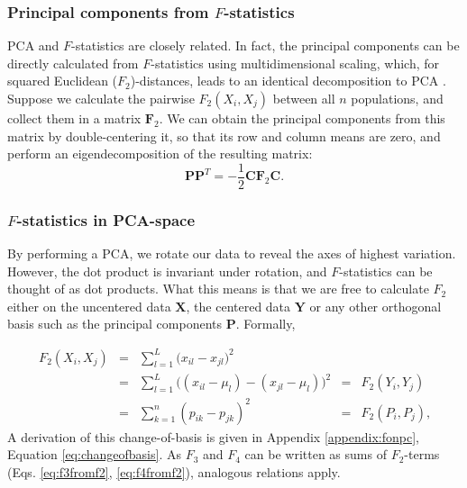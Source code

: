 \documentclass[12pt,fullpage, a4paper]{article}
\newcommand{\MX}{\mathbf{X}} %
\newcommand{\MC}{\mathbf{C}} %
\newcommand{\MY}{\mathbf{Y}} %
\newcommand{\MF}{\mathbf{F}_2} %
\newcommand{\MP}{\mathbf{P}} %
\begin{document}
\subsubsection{Principal components from $F$-statistics}
PCA and $F$-statistics are closely related. In fact, the principal components can be directly calculated from $F$-statistics using multidimensional scaling, which, for squared Euclidean ($F_2$)-distances, leads to an identical decomposition to PCA \citep{gower1966}. Suppose we calculate the pairwise $F_2(X_i, X_j)$ between all $n$ populations, and collect them in a matrix $\MF$. We can obtain the principal components from this matrix by double-centering it, so that its row and column means are zero, and perform an eigendecomposition of the resulting matrix:
\begin{equation}
\MP\MP^T = - \frac{1}{2}\MC\MF\MC \text{.} \label{eq:mds}
\end{equation}

\subsubsection{$F$-statistics in PCA-space}
By performing a PCA, we rotate our data to reveal the axes of highest variation. However, the dot product is invariant under rotation, and $F$-statistics can be thought of as dot products.  What this means is that we are free to calculate $F_2$ either on the uncentered data $\MX$, the centered data $\MY$ or any other orthogonal basis such as the principal components $\MP$. Formally,

\begin{align}
F_2(X_i, X_j) &=&  \sum_{l=1}^L \big( x_{il} -x_{jl}\big)^2  &&\nonumber\\ 
&=& \sum_{l=1}^L \big( (x_{il} - \mu_l) -(x_{jl} -\mu_l)\big)^2   &=& F_2(Y_i, Y_j) \nonumber\\
&=& \sum_{k=1}^n (p_{ik} - p_{jk})^2  &=& F_2(P_i, P_j) \text{,}\label{eq:fpc}
\end{align}
A derivation of this change-of-basis is given in Appendix \ref{appendix:fonpc}, Equation \ref{eq:changeofbasis}.
As $F_3$ and $F_4$ can be written as sums of $F_2$-terms (Eqs. \ref{eq:f3fromf2}, \ref{eq:f4fromf2}), analogous relations apply.
\end{document}
